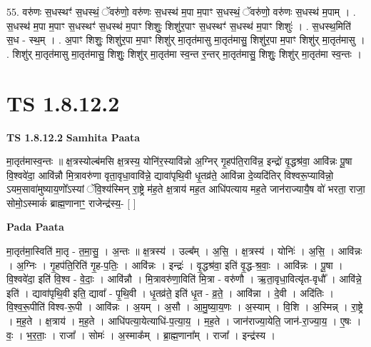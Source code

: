 \documentclass[17pt]{extarticle}
\begin{document}
55. वरु॑णः स॒धस्थꣳ॑ स॒धस्थं॒ ॅवरु॑णो॒ वरु॑णः स॒धस्थ॑ म॒पा म॒पाꣳ स॒धस्थं॒ ॅवरु॑णो॒ वरु॑णः स॒धस्थ॑ म॒पाम् । . स॒धस्थ॑ म॒पा म॒पाꣳ स॒धस्थꣳ॑ स॒धस्थ॑ म॒पाꣳ शिशुः॒ शिशु॑र॒पाꣳ स॒धस्थꣳ॑ स॒धस्थ॑ म॒पाꣳ शिशुः॑ । . स॒धस्थ॒मिति॑ स॒ध - स्थ॒म् । . अ॒पाꣳ शिशुः॒ शिशु॑र॒पा म॒पाꣳ शिशु॑र् मा॒तृत॑मासु मा॒तृत॑मासु॒ शिशु॑र॒पा म॒पाꣳ शिशु॑र् मा॒तृत॑मासु । . शिशु॑र् मा॒तृत॑मासु मा॒तृत॑मासु॒ शिशुः॒ शिशु॑र् मा॒तृत॑मा स्व॒न्त र॒न्तर् मा॒तृत॑मासु॒ शिशुः॒ शिशु॑र् मा॒तृत॑मा स्व॒न्तः । \newline
\pagebreak
{}
\section*{ TS 1.8.12.2 }

\textbf{TS 1.8.12.2 } \newline
\textbf{Samhita Paata} \newline

मा॒तृत॑मास्व॒न्तः ॥ क्ष॒त्रस्योल्ब॑मसि क्ष॒त्रस्य॒ योनि॑र॒स्यावि॑न्नो अ॒ग्निर् गृ॒हप॑ति॒रावि॑न्न॒ इन्द्रो॑ वृ॒द्धश्र॑वा॒ आवि॑न्नः पू॒षा वि॒श्ववे॑दा॒ आवि॑न्नौ मि॒त्रावरु॑णा वृता॒वृधा॒वावि॑न्ने॒ द्यावा॑पृथि॒वी धृ॒तव्र॑ते॒ आवि॑न्ना दे॒व्यदि॑तिर् विश्वरू॒प्यावि॑न्नो॒ ऽयम॒सावा॑मुष्याय॒णो᳚ऽस्यां ॅवि॒श्य॑स्मिन् रा॒ष्ट्रे म॑ह॒ते क्ष॒त्राय॑ मह॒त आधि॑पत्याय मह॒ते जान॑राज्यायै॒ष वो॑ भरता॒ राजा॒ सोमो॒ऽस्माकं॑ ब्राह्म॒णानाꣳ॒॒ राजेन्द्र॑स्य॒- [ ] \newline

\textbf{Pada Paata} \newline

मा॒तृत॑मा॒स्विति॑ मा॒तृ - त॒मा॒सु॒ । अ॒न्तः ॥ क्ष॒त्रस्य॑ । उल्ब᳚म् । अ॒सि॒ । क्ष॒त्रस्य॑ । योनिः॑ । अ॒सि॒ । आवि॑न्नः । अ॒ग्निः । गृ॒हप॑ति॒रिति॑ गृ॒ह-प॒तिः॒ । आवि॑न्नः । इन्द्रः॑ । वृ॒द्धश्र॑वा॒ इति॑ वृ॒द्ध-श्र॒वाः॒ । आवि॑न्नः । पू॒षा । वि॒श्ववे॑दा॒ इति॑ वि॒श्व - वे॒दाः॒ । आवि॑न्नौ । मि॒त्रावरु॑णा॒विति॑ मि॒त्रा - वरु॑णौ । ऋ॒ता॒वृधा॒वित्यृ॑त-वृधौ᳚ । आवि॑न्ने॒ इति॑ । द्यावा॑पृथि॒वी इति॒ द्यावा᳚ - पृ॒थि॒वी । धृ॒तव्र॑ते॒ इति॑ धृ॒त - व्र॒ते॒ । आवि॑न्ना । दे॒वी । अदि॑तिः । वि॒श्व॒रू॒पीति॑ विश्व-रू॒पी । आवि॑न्नः । अ॒यम् । अ॒सौ । आ॒मु॒ष्या॒य॒णः । अ॒स्याम् । वि॒शि । अ॒स्मिन्न् । रा॒ष्ट्रे । म॒ह॒ते । क्ष॒त्राय॑ । म॒ह॒ते । आधि॑पत्या॒येत्याधि॑-प॒त्या॒य॒ । म॒ह॒ते । जान॑राज्या॒येति॒ जान॑-रा॒ज्या॒य॒ । ए॒षः । वः॒ । भ॒र॒ताः॒ । राजा᳚ । सोमः॑ । अ॒स्माक᳚म् । ब्रा॒ह्म॒णाना᳚म् । राजा᳚ । इन्द्र॑स्य ।  \newline
\end{document}
